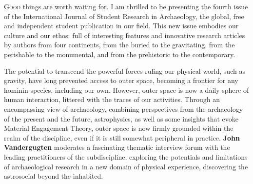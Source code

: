 \def\IJSRAidentifier{\currfilebase} %
\def\shorttitle{Issue Presentation}
\def\maintitle{Presentation of the fourth issue of IJSRA}
\def\cmail{gonzalo.linaresmatas@st-hughs.ox.ac.uk}
\def\authorone{Gonzalo Linares Matás}
\def\bioone{\href{https://oxford.academia.edu/GonzaloLinaresMatás}{\authorone}   is reading for an MSt in Landscape Archaeology and Molecular Bioarchaeology at St Hugh’s College, University of Oxford (UK). His research focuses on vertebrate taphonomy, with a special emphasis on canids, and Pleistocene zooarchaeology. He was the former President of the Oxford University Archaeology Society (Michaelmas 2015) and was invited to join the WAC (World Archaeology Congress) Student Committee (2017).

He is also particularly interested in the socio-political contexts of heritage management and ownership, contemporary archaeological theory, and the histories of the academic disciplines of archaeology and anthropology as practical modes of inquiry. Gonzalo is convinced that more efforts are needed to transform the academic publishing landscape.}
\def\affilone{Executive Editor, International Journal of Student Research in Archaeology
\\St Hugh’s College, University of Oxford}


\IJSRAopening%
\lettrine{G}{ood} things are worth waiting for. I am thrilled to be presenting the fourth issue of the International Journal of Student Research in Archaeology, the global, free and independent student publication in our field. This new issue embodies our culture and our ethos: full of interesting features and innovative research articles by authors from four continents, from the buried to the gravitating, from the perishable to the monumental, and from the prehistoric to the contemporary.

The potential to transcend the powerful forces ruling our physical world, such as gravity, have long prevented access to outer space, becoming a frontier for any hominin species, including our own. However, outer space is now a daily sphere of human interaction, littered with the traces of our activities. Through an encompassing view of archaeology, combining perspectives from the archaeology of the present and the future, astrophysics, as well as some insights that evoke Material Engagement Theory, outer space is now firmly grounded within the realm of the discipline, even if it is still somewhat peripheral in practice. \textbf{John Vandergugten} moderates a fascinating thematic interview forum with the leading practitioners of the subdiscipline, exploring the potentials and limitations of archaeological research in a new domain of physical experience, discovering the astrosocial beyond the inhabited.

